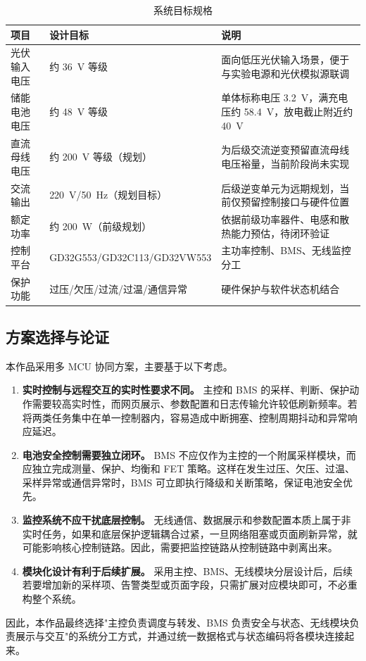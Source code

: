 \begin{table}[htbp]
  \centering
  \caption{系统目标规格}
  \label{tab:spec}
  \begin{tabular}{@{}llp{7.2cm}@{}}
    \toprule
    \textbf{项目} & \textbf{设计目标} & \textbf{说明} \\
    \midrule
    光伏输入电压   & 约 36~V 等级            & 面向低压光伏输入场景，便于与实验电源和光伏模拟源联调 \\
    储能电池电压   & 约 48~V 等级            & 单体标称电压 3.2~V，满充电压约 58.4~V，放电截止附近约 40~V \\
    直流母线电压   & 约 200~V 等级（规划）    & 为后级交流逆变预留直流母线电压裕量，当前阶段尚未实现 \\
    交流输出       & 220~V/50~Hz（规划目标）  & 后级逆变单元为远期规划，当前仅预留控制接口与硬件位置 \\
    额定功率       & 约 200~W（前级规划）    & 依据前级功率器件、电感和散热能力预估，待闭环验证 \\
    控制平台       & GD32G553/GD32C113/GD32VW553 & 主功率控制、BMS、无线监控分工 \\
    保护功能       & 过压/欠压/过流/过温/通信异常 & 硬件保护与软件状态机结合 \\
    \bottomrule
  \end{tabular}
\end{table}

\subsection{方案选择与论证}

本作品采用多 MCU 协同方案，主要基于以下考虑。

\begin{enumerate}[label=\arabic*、, leftmargin=*, itemsep=0.8ex, parsep=0pt, topsep=0.5ex]
  \item \textbf{实时控制与远程交互的实时性要求不同。}
  主控和 BMS 的采样、判断、保护动作需要较高实时性，而网页展示、参数配置和日志传输允许较低刷新频率。若将两类任务集中在单一控制器内，容易造成中断拥塞、控制周期抖动和异常响应延迟。

  \item \textbf{电池安全控制需要独立闭环。}
  BMS 不应仅作为主控的一个附属采样模块，而应独立完成测量、保护、均衡和 FET 策略。这样在发生过压、欠压、过温、采样异常或通信异常时，BMS 可立即执行降级和关断策略，保证电池安全优先。

  \item \textbf{监控系统不应干扰底层控制。}
  无线通信、数据展示和参数配置本质上属于非实时任务，如果和底层保护逻辑耦合过紧，一旦网络阻塞或页面刷新异常，就可能影响核心控制链路。因此，需要把监控链路从控制链路中剥离出来。

  \item \textbf{模块化设计有利于后续扩展。}
  采用主控、BMS、无线模块分层设计后，后续若要增加新的采样项、告警类型或页面字段，只需扩展对应模块即可，不必重构整个系统。
\end{enumerate}
因此，本作品最终选择"主控负责调度与转发、BMS 负责安全与状态、无线模块负责展示与交互"的系统分工方式，并通过统一数据格式与状态编码将各模块连接起来。
